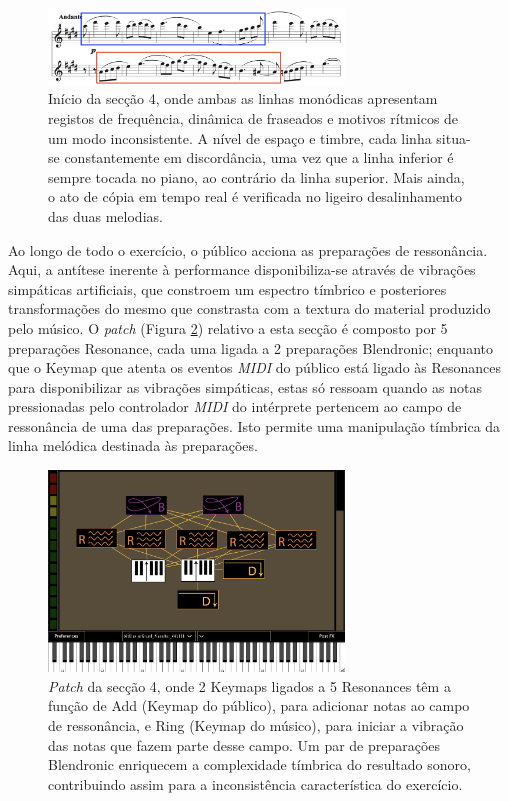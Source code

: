 \documentclass[../main.tex]{subfiles}
\begin{document}
\begin{figure}[h]
    \centering
    \captionsetup{width=0.8\textwidth}
    \includegraphics[width=0.7\textwidth]{images/obra4.png}
    \caption{Início da secção 4, onde ambas as linhas monódicas apresentam registos de frequência, dinâmica de fraseados e motivos rítmicos de um modo inconsistente. A nível de espaço e timbre, cada linha situa-se constantemente em discordância, uma vez que a linha inferior é sempre tocada no piano, ao contrário da linha superior. Mais ainda, o ato de cópia em tempo real é verificada no ligeiro desalinhamento das duas melodias.}
    \label{fig:obra4}
\end{figure}

Ao longo de todo o exercício, o público acciona as preparações de ressonância. Aqui, a antítese inerente à performance disponibiliza-se através de vibrações simpáticas artificiais, que constroem um espectro tímbrico e posteriores transformações do mesmo que constrasta com a textura do material produzido pelo músico.
O \textsl{patch} (Figura \ref{fig:bit4}) relativo a esta secção é composto por 5 preparações Resonance, cada uma ligada a 2 preparações Blendronic; enquanto que o Keymap que atenta os eventos \textsl{MIDI} do público está ligado às Resonances para disponibilizar as vibrações simpáticas, estas só ressoam quando as notas pressionadas pelo controlador \textsl{MIDI} do intérprete pertencem ao campo de ressonância de uma das preparações. Isto permite uma manipulação tímbrica da linha melódica destinada às preparações.

\begin{figure}[h]
    \centering
    \captionsetup{width=0.8\textwidth}
    \includegraphics[width=0.7\textwidth]{images/bit4.png}
    \caption{\textsl{Patch} da secção 4, onde 2 Keymaps ligados a 5 Resonances têm a função de Add (Keymap do público), para adicionar notas ao campo de ressonância, e Ring (Keymap do músico), para iniciar a vibração das notas que fazem parte desse campo. Um par de preparações Blendronic enriquecem a complexidade tímbrica do resultado sonoro, contribuindo assim para a inconsistência característica do exercício.}
    \label{fig:bit4}
\end{figure}
\end{document}
